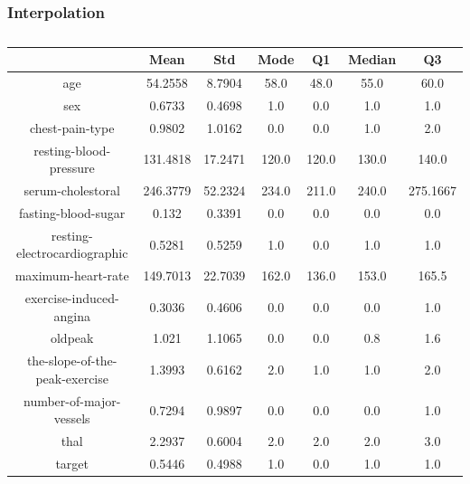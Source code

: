 \documentclass{classrep}
\begin{document}
{{{            }

            \subsubsection{Interpolation}
            \label{results:5-percent:interpolation} {
                \begin{table}[!htbp]
                    \centering
                    \begin{tabular}{|c|c|c|c|c|c|c|}
                        \hline
                        & Mean & Std & Mode & Q1 & Median & Q3 \\ \hline
                        age & 54.2558 & 8.7904 & 58.0 & 48.0 & 55.0 & 60.0 \\ \hline
                        sex & 0.6733 & 0.4698 & 1.0 & 0.0 & 1.0 & 1.0 \\ \hline
                        chest-pain-type & 0.9802 & 1.0162 & 0.0 & 0.0 & 1.0 & 2.0 \\ \hline
                        resting-blood-pressure & 131.4818 & 17.2471 & 120.0 & 120.0 & 130.0 & 140.0 \\ \hline
                        serum-cholestoral & 246.3779 & 52.2324 & 234.0 & 211.0 & 240.0 & 275.1667 \\ \hline
                        fasting-blood-sugar & 0.132 & 0.3391 & 0.0 & 0.0 & 0.0 & 0.0 \\ \hline
                        resting-electrocardiographic & 0.5281 & 0.5259 & 1.0 & 0.0 & 1.0 & 1.0 \\ \hline
                        maximum-heart-rate & 149.7013 & 22.7039 & 162.0 & 136.0 & 153.0 & 165.5 \\ \hline
                        exercise-induced-angina & 0.3036 & 0.4606 & 0.0 & 0.0 & 0.0 & 1.0 \\ \hline
                        oldpeak & 1.021 & 1.1065 & 0.0 & 0.0 & 0.8 & 1.6 \\ \hline
                        the-slope-of-the-peak-exercise & 1.3993 & 0.6162 & 2.0 & 1.0 & 1.0 & 2.0 \\ \hline
                        number-of-major-vessels & 0.7294 & 0.9897 & 0.0 & 0.0 & 0.0 & 1.0 \\ \hline
                        thal & 2.2937 & 0.6004 & 2.0 & 2.0 & 2.0 & 3.0 \\ \hline
                        target & 0.5446 & 0.4988 & 1.0 & 0.0 & 1.0 & 1.0 \\ \hline
                    \end{tabular}
                    \caption{}
                    \label{result_5_Interpolation}
                \end{table}
                \FloatBarrier

}}}
\end{document}
